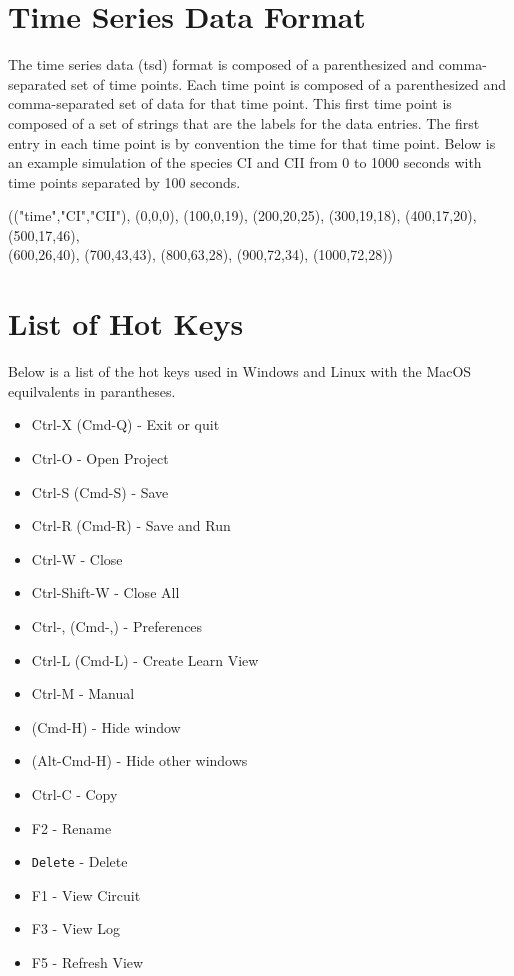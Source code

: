 \documentclass[titlepage,11pt]{article}
\begin{document}
\section{\label{TSD}Time Series Data Format}

\noindent
The time series data (tsd) format is composed of a
parenthesized and comma-separated set of time points. Each time
point is composed of a parenthesized and comma-separated set of
data for that time point. This first time point is composed of a
set of strings that are the labels for the data entries. The
first entry in each time point is by convention the time for that
time point. Below is an example simulation of the species CI and
CII from 0 to 1000 seconds with time points separated by 100
seconds. 

(("time","CI","CII"), (0,0,0), (100,0,19), (200,20,25), (300,19,18),
(400,17,20), (500,17,46), \\
(600,26,40), (700,43,43), (800,63,28), (900,72,34), (1000,72,28))

\section{\label{HotKeys}List of Hot Keys}

Below is a list of the hot keys used in Windows and Linux with the
MacOS equilvalents in parantheses.
\begin{itemize}
\item Ctrl-X (Cmd-Q) - Exit or quit
\item Ctrl-O - Open Project
\item Ctrl-S (Cmd-S) - Save
\item Ctrl-R (Cmd-R) - Save and Run
\item Ctrl-W - Close
\item Ctrl-Shift-W - Close All
\item Ctrl-, (Cmd-,) - Preferences
\item Ctrl-L (Cmd-L) - Create Learn View
\item Ctrl-M - Manual
\item (Cmd-H) - Hide window
\item (Alt-Cmd-H) - Hide other windows
\item Ctrl-C - Copy
\item F2 - Rename
\item {\tt Delete} - Delete
\item F1 - View Circuit
\item F3 - View Log
\item F5 - Refresh View
\end{itemize}
\end{document}

